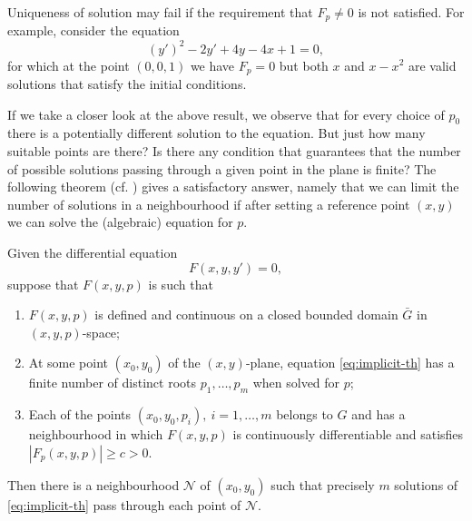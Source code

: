 \begin{remark} Uniqueness of solution may fail if the requirement that $F_p\neq 0$ is not satisfied. For example, consider the equation
\[
(y')^2 - 2y' + 4y - 4x + 1 = 0,
\]
for which at the point $(0,0,1)$ we have $F_p=0$ but both $x$ and $x-x^2$ are valid solutions that satisfy the initial conditions.
\end{remark}

If we take a closer look at the above result, we observe that for every choice of $p_0$ there is a potentially different solution to the equation. But just how many suitable points are there? Is there any condition that guarantees that the number of possible solutions passing through a given point in the plane is finite? The following theorem (cf. \cite[76]{petrovski1966ordinary}) gives a satisfactory answer, namely that we can limit the number of solutions in a neighbourhood if after setting a reference point $(x,y)$ we can solve the (algebraic) equation for $p$.

\begin{theorem} \label{th:implicit2} Given the differential equation
\begin{equation}\label{eq:implicit-th}
  F(x,y,y')=0,
\end{equation}
suppose that $F(x,y,p)$ is such that
\begin{enumerate}
  \item $F(x,y,p)$ is defined and continuous on a closed bounded domain $\bar{G}$ in $(x,y,p)$-space;
  \item At some point $(x_0,y_0)$ of the $(x,y)$-plane, equation \eqref{eq:implicit-th} has a finite number of distinct roots $p_1,\dots,p_m$ when solved for $p$;
  \item Each of the points $(x_0,y_0,p_i), \ i=1,\dots,m$ belongs to $G$ and has a neighbourhood in which $F(x,y,p)$ is continuously differentiable and satisfies $|F_p(x,y,p)|\ge c > 0$.
\end{enumerate}
Then there is a neighbourhood $\mathcal N$ of $(x_0,y_0)$ such that precisely $m$ solutions of \eqref{eq:implicit-th} pass through each point of $\mathcal N$.

\end{theorem}

